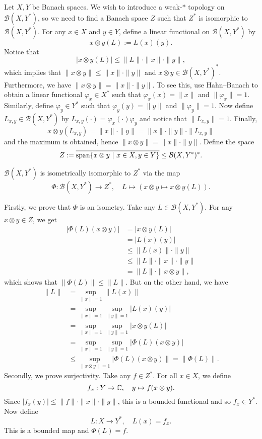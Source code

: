 Let $X, Y$ be Banach spaces. We wish to introduce a weak-$*$ topology on $\mathcal{B}(X, Y^*)$, so we need to find 
a Banach space $Z$ such that $Z^*$ is isomorphic to $\mathcal{B}(X, Y^*)$.
For any $x \in X$ and $y \in Y$, define a linear functional on $\mathcal{B}(X, Y^*)$ by 
$$x \otimes y (L) := L(x) (y).$$ Notice that $$| x \otimes y (L)| \leq \| L\| \cdot \| x\| \cdot \| y\|,$$
which implies that $\| x \otimes y\| \leq \| x\| \cdot \| y\|$ and $x \otimes y \in \mathcal{B} (X, Y^*)^*$.
Furthermore, we have $\| x \otimes y \| = \| x\| \cdot \| y\|$. To see this, use Hahn--Banach to obtain a linear functional 
$\varphi_x \in X^*$ such that $\varphi_x (x) = \| x\|$ and $\| \varphi_x \| = 1$. Similarly, 
define $\varphi_y \in Y^*$ such that $\varphi_y (y) = \| y\|$ and $\| \varphi_y \| = 1$. Now define $L_{x, y} \in \mathcal{B}(X, Y^*)$
by $L_{x, y}(\cdot) = \varphi_x (\cdot) \varphi_y$ and notice that $\| L_{x, y}\| = 1$.
Finally, 
$$x \otimes y (L_{x, y}) = \| x\| \cdot \| y\| = \| x\| \cdot \| y\| \cdot \| L_{x, y} \|$$
and the maximum is obtained, hence $\| x \otimes y\| = \| x\| \cdot \| y\|$. 
Define the space 
$$Z := \overline{\operatorname{span} \{x \otimes y\ |\ x \in X, y \in Y\}} \leq \mathcal{B} (X, Y^*)^*.$$
\begin{lemma}
    $\mathcal{B} (X, Y^*)$ is isometrically isomorphic to $Z^*$ via the map 
    $$\Phi: \mathcal{B}(X, Y^*) \to Z^*,\quad L \mapsto (x \otimes y \mapsto x \otimes y (L)).$$
\end{lemma}

\begin{myproof}
    Firstly, we prove that $\Phi$ is an isometry. Take any $L \in \mathcal{B}(X, Y^*)$.
    For any $x \otimes y \in Z$, we get 
    \begin{align*}
        | \Phi (L) (x \otimes y)| &= | x \otimes y (L)|\\
        &= | L(x) (y) |\\
        &\leq \| L(x)\| \cdot \| y\|\\
        &\leq \| L\| \cdot \| x\| \cdot \| y\|\\
        &= \| L \| \cdot \| x \otimes y\|,
    \end{align*}
    which shows that $\| \Phi(L) \| \leq \| L\|$. But on the other hand, we have 
    \begin{align*}
        \| L\| &= \sup_{\| x\| = 1} \| L(x) \| \\
        &= \sup_{\| x\| = 1} \sup_{\| y\| = 1} | L(x) (y)|\\
        &= \sup_{\| x\| = 1} \sup_{\| y\| = 1} | x \otimes y (L)|\\
        &= \sup_{\| x\| = 1} \sup_{\| y\| = 1} | \Phi (L) (x \otimes y)|\\
        &\leq \sup_{\| x \otimes y\| = 1} |\Phi (L) (x \otimes y)\| = \| \Phi (L)\|. 
    \end{align*}
    Secondly, we prove surjectivity. Take any $f \in Z^*$.
    For all $x \in X$, we define 
    $$f_x : Y \to \mathbb {C},\quad y \mapsto f(x \otimes y).$$
    Since $| f_x (y)| \leq \| f\| \cdot \| x\| \cdot \| y\|$, this is a bounded functional and so $f_x \in Y^*$.
    Now define $$L : X \to Y^*,\quad L(x) = f_x.$$
    This is a bounded map and $\Phi(L) = f$. 
\end{myproof}

